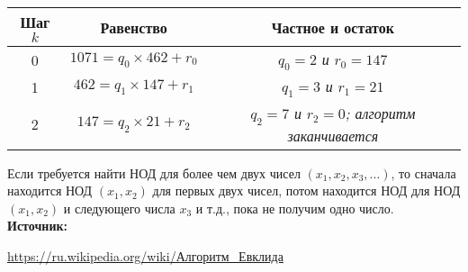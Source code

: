 \documentclass[12pt,a4paper]{scrartcl}
\begin{document}
\begin{table}[H]
	\centering
	\begin{tabular}{|c|c|c|}
		\hline
		\textbf{Шаг $k$} & \textbf{Равенство}     & \textbf{Частное и остаток}                             \\ \hline
		0                & $1071 = q_0\times 462 + r_0$ & \textit{$q_0 = 2 $ и $ r_0 = 147 $}                    \\ \hline
		1                & $462 = q_1\times 147 + r_1$  & \textit{$q_1 = 3$ и $r_1 = 21$}                        \\ \hline
		2                & $147 = q_2\times21 + r_2$   & \textit{$q_2 = 7$ и $r_2 = 0$; алгоритм заканчивается} \\ \hline
	\end{tabular}
\end{table}

Если требуется найти НОД для более чем двух чисел $(x_1,x_2,x_3,...)$, то сначала находится НОД $(x_1,x_2)$ для первых двух чисел, потом находится НОД для НОД $(x_1,x_2)$ и следующего числа $x_3$ и т.д., пока не получим одно число.\\ 

\textbf{Источник:}

\href{https://ru.wikipedia.org/wiki/%D0%90%D0%BB%D0%B3%D0%BE%D1%80%D0%B8%D1%82%D0%BC_%D0%95%D0%B2%D0%BA%D0%BB%D0%B8%D0%B4%D0%B0}{https://ru.wikipedia.org/wiki/Алгоритм\_Евклида}

	
\end{document}
